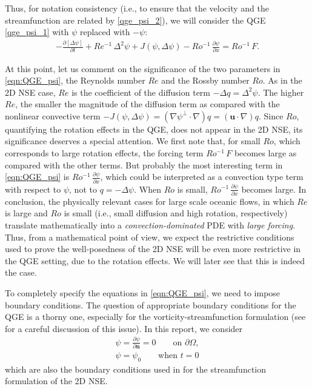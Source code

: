 Thus, for notation consistency (i.e., to ensure that the velocity and the
streamfunction are related by \eqref{qge_psi_2}), we will consider the QGE
\eqref{qge_psi_1} with $\psi$ replaced with $-\psi$:
\begin{align}
  -\frac{\partial \left[ \Delta \psi \right]}{\partial t} + Re^{-1} \, \Delta^2 \psi + J(\psi , \Delta \psi)
    - Ro^{-1} \, \frac{\partial \psi}{\partial x} = Ro^{-1} \, F .  \label{eqn:QGE_psi}
\end{align}

At this point, let us comment on the significance of the two parameters in
\eqref{eqn:QGE_psi}, the Reynolds number $Re$ and the Rossby number $Ro$.  As in
the 2D NSE case, $Re$ is the coefficient of the diffusion term $- \Delta q =
\Delta^2 \psi$.  The higher $Re$, the smaller the magnitude of the diffusion
term as compared with the nonlinear convective term $- J(\psi, \Delta \psi) = (
\nabla \psi^{\perp} \cdot \nabla ) q = (\mathbf{u} \cdot \nabla ) q$.  Since
$Ro$, quantifying the rotation effects in the QGE, does not appear in the 2D
NSE, its significance deserves a special attention.  We first note that, for
small $Ro$, which corresponds to large rotation effects, the forcing term
$Ro^{-1} \, F$ becomes large as compared with the other terms.  But probably the
most interesting term in \eqref{eqn:QGE_psi} is $\displaystyle Ro^{-1} \,
\frac{\partial \psi}{\partial x}$, which could be interpreted as a convection
type term with respect to $\psi$, not to $q = -\Delta \psi$.  When $Ro$ is
small, $\displaystyle Ro^{-1} \, \frac{\partial \psi}{\partial x}$ becomes
large.  In conclusion, the physically relevant cases for large scale oceanic
flows, in which $Re$ is large and $Ro$ is small (i.e., small diffusion and high
rotation, respectively) translate mathematically into a
\emph{convection-dominated} PDE with \emph{large forcing}.  Thus, from a
mathematical point of view, we expect the restrictive conditions used to prove
the well-posedness of the 2D NSE \cite{Girault79,Girault86,Gunzburger89} will be
even more restrictive in the QGE setting, due to the rotation effects.  We will
later see that this is indeed the case.

To completely specify the equations in \eqref{eqn:QGE_psi}, we need to impose
boundary conditions.  The question of appropriate boundary conditions for the
QGE is a thorny one, especially for the vorticity-streamfunction formulation
(see \cite{Vallis06,Cummins} for a careful discussion of this issue).  In this
report, we consider
\begin{equation}
  \begin{split}
    \psi = \frac{\partial \psi}{\partial \mathbf{n}} = 0 \qquad \text{on } \partial \Omega, \\
    \psi = \psi_0 \qquad \text{when } t = 0
  \end{split}
\label{qge_psi_4}
\end{equation}
which are also the boundary conditions used in \cite{Gunzburger89} for the
streamfunction formulation of the 2D NSE.

